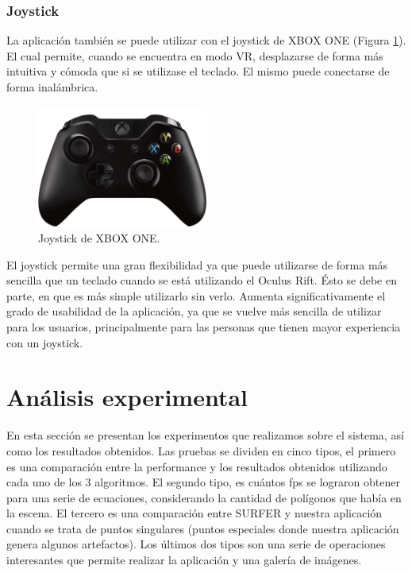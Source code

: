 \documentclass[12pt]{article}
\begin{document}

\subsubsection{Joystick}
\noindent La aplicación también se puede utilizar con el joystick de XBOX ONE (Figura \ref{xbox}). El cual permite, cuando se encuentra en modo VR, desplazarse de forma más intuitiva y cómoda que si se utilizase el teclado. El mismo puede conectarse de forma inalámbrica.\\
\begin{figure}[h!]
\includegraphics[width=0.5\textwidth,center]{joystickPosta.png}
\caption{Joystick de XBOX ONE.}
\label{xbox}
\end{figure}

El joystick permite una gran flexibilidad ya que puede utilizarse de forma más sencilla que un teclado cuando se está utilizando el Oculus Rift. Ésto se debe en parte, en que es más simple utilizarlo sin verlo. Aumenta significativamente el grado de usabilidad de la aplicación, ya que se vuelve más sencilla de utilizar para los usuarios, principalmente para las personas que tienen mayor experiencia con un joystick.
\clearpage
\null\newpage
\section{Análisis experimental}
\noindent En esta sección se presentan los experimentos que realizamos sobre el sistema, así como los resultados obtenidos. Las pruebas se dividen en cinco tipos, el primero es una comparación entre la performance y los resultados obtenidos utilizando cada uno de los 3 algoritmos. El segundo tipo, es cuántos fps se lograron obtener para una serie de ecuaciones, considerando la cantidad de polígonos que había en la escena. El tercero es una comparación entre SURFER y nuestra aplicación cuando se trata de puntos singulares (puntos especiales donde nuestra aplicación genera algunos artefactos). Los últimos dos tipos son una serie de operaciones interesantes que permite realizar la aplicación y una galería de imágenes.
\end{document}
